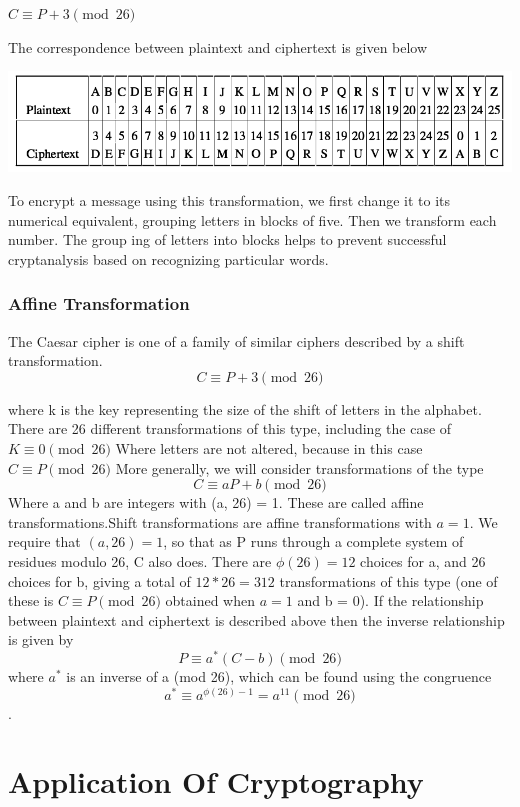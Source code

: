 \documentclass{report}
\begin{document}
{{{$C \equiv P+3\pmod{26}$

The correspondence between plaintext and ciphertext is given below}

\begin{center}
\includegraphics[scale=0.5]{"table2.png"}
\end{center}

\Large{To encrypt a message using this transformation, we first change it to its numerical
equivalent, grouping letters in blocks of five. Then we transform each number. The group­
ing of letters into blocks helps to prevent successful cryptanalysis based on recognizing
particular words.}
\subsection*{Affine Transformation}
\Large{The Caesar cipher is one of a family of similar ciphers described by a shift transformation.
$$C \equiv P+3\pmod{26}$$

where k is the key representing the size of the shift of letters in the alphabet. There are
26 different transformations of this type, including the case of $K\equiv 0\pmod{26}$
Where letters are not altered, because in this case $C \equiv P\pmod{26}$ More generally, we will consider transformations of the type 
$$C \equiv aP+b\pmod{26}$$ 
Where a and b are integers with (a, 26) = 1. These are called affine transformations.Shift transformations are affine transformations with $a= 1$. We require that $(a, 26) = 1$,
so that as P runs through a complete system of residues modulo 26, C also does. There
are $\phi(26) = 12$ choices for a, and 26 choices for b, giving a total of $12*26 = 312$
transformations of this type (one of these is $C \equiv P\pmod{26}$ obtained when $a = 1$ and
b = 0). If the relationship between plaintext and ciphertext is described above then the inverse relationship is given by
$$P \equiv a^*(C-b)\pmod{26}$$ 
where $a^*$ is an inverse of a (mod 26), which can be found using the congruence $$a^* \equiv a^{\phi(26)-1} =a^{11}\pmod{26}$$.

\chapter{Application Of Cryptography }
}}}
\end{document}
